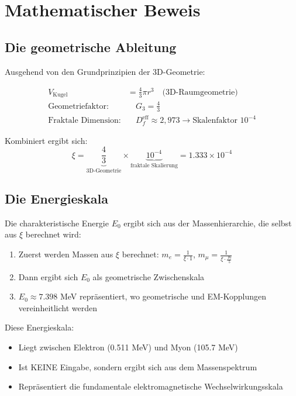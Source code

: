 	\section{Mathematischer Beweis}
	
	\subsection{Die geometrische Ableitung}
	
	Ausgehend von den Grundprinzipien der 3D-Geometrie:
	
	\begin{align}
		V_{\text{Kugel}} &= \frac{4}{3}\pi r^3 \quad \text{(3D-Raumgeometrie)}\\
		\text{Geometriefaktor:} & \quad G_3 = \frac{4}{3}\\
		\text{Fraktale Dimension:} & \quad D_f^{\text{eff}} \approx 2{,}973 \rightarrow \text{Skalenfaktor } 10^{-4}
	\end{align}
	
	Kombiniert ergibt sich:
	\begin{equation}
		\xi = \underbrace{\frac{4}{3}}_{\text{3D-Geometrie}} \times \underbrace{10^{-4}}_{\text{fraktale Skalierung}} = 1.333 \times 10^{-4}
	\end{equation}
	
	\subsection{Die Energieskala}
	
	Die charakteristische Energie $E_0$ ergibt sich aus der Massenhierarchie, die selbst aus $\xi$ berechnet wird:
	
	\begin{enumerate}
		\item Zuerst werden Massen aus $\xi$ berechnet: $m_e = \frac{1}{\xi \cdot 1}$, $m_\mu = \frac{1}{\xi \cdot \frac{16}{5}}$
		\item Dann ergibt sich $E_0$ als geometrische Zwischenskala
		\item $E_0 \approx 7.398$ MeV repräsentiert, wo geometrische und EM-Kopplungen vereinheitlicht werden
	\end{enumerate}
	
	Diese Energieskala:
	\begin{itemize}
		\item Liegt zwischen Elektron (0.511 MeV) und Myon (105.7 MeV)
		\item Ist KEINE Eingabe, sondern ergibt sich aus dem Massenspektrum
		\item Repräsentiert die fundamentale elektromagnetische Wechselwirkungsskala
	\end{itemize}
	
